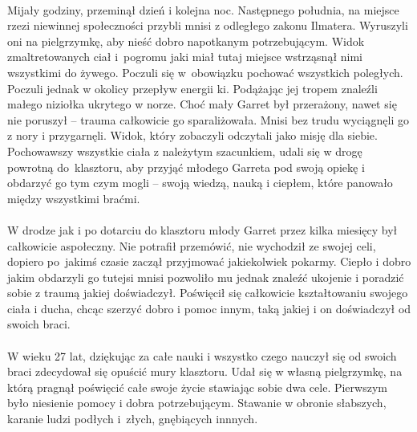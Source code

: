 \documentclass[10pt,twoside,twocolumn]{book}
\begin{document}
\paragraph{}
Mijały godziny, przeminął dzień i kolejna noc.
Następnego południa, na miejsce rzezi niewinnej społeczności przybli mnisi z odległego zakonu Ilmatera.
Wyruszyli oni na pielgrzymkę, aby nieść dobro napotkanym potrzebującym.
Widok zmaltretowanych ciał i pogromu jaki miał tutaj miejsce wstrząsnął nimi wszystkimi do żywego.
Poczuli się w obowiązku pochować wszystkich poległych.
Poczuli jednak w okolicy przepływ energii ki.
Podążając jej tropem znaleźli małego niziołka ukrytego w norze.
Choć mały Garret był przerażony, nawet się nie poruszył – trauma całkowicie go sparaliżowała.
Mnisi bez trudu wyciągnęli go z nory i przygarnęli.
Widok, który zobaczyli odczytali jako misję dla siebie.
Pochowawszy wszystkie ciała z należytym szacunkiem, udali się w drogę powrotną do klasztoru, aby przyjąć młodego Garreta pod swoją opiekę i obdarzyć go tym czym mogli – swoją wiedzą, nauką i ciepłem, które panowało między wszystkimi braćmi.

\paragraph{}
W drodze jak i po dotarciu do klasztoru młody Garret przez kilka miesięcy był całkowicie aspołeczny.
Nie potrafił przemówić, nie wychodził ze swojej celi, dopiero po jakimś czasie zaczął przyjmować jakiekolwiek pokarmy.
Ciepło i dobro jakim obdarzyli go tutejsi mnisi pozwoliło mu jednak znaleźć ukojenie i poradzić sobie z traumą jakiej doświadczył.
Poświęcił się całkowicie kształtowaniu swojego ciała i ducha, chcąc szerzyć dobro i pomoc innym, taką jakiej i on doświadczył od swoich braci.

\paragraph{}
W wieku 27 lat, dziękując za całe nauki i wszystko czego nauczył się od swoich braci zdecydował się opuścić mury klasztoru.
Udał się w własną pielgrzymkę, na którą pragnął poświęcić całe swoje życie stawiając sobie dwa cele.
Pierwszym było niesienie pomocy i dobra potrzebującym.
Stawanie w obronie słabszych, karanie ludzi podłych i złych, gnębiących innnych.
\end{document}
